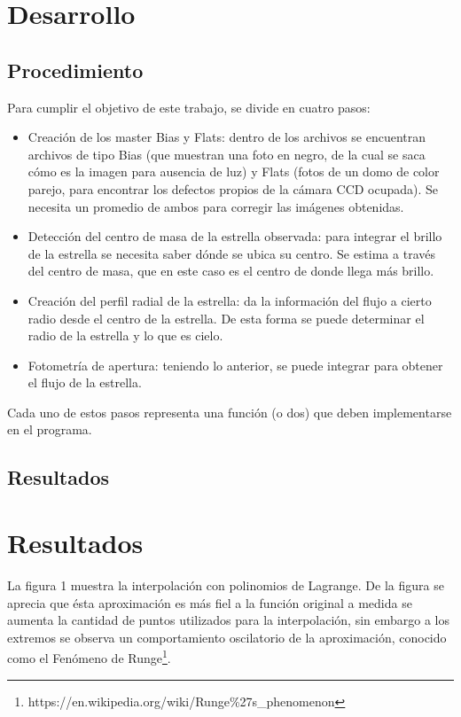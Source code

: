 \documentclass[a4paper, 11pt, spanish]{article}
\begin{document}
\section{Desarrollo}
\subsection{Procedimiento}

Para cumplir el objetivo de este trabajo, se divide en cuatro pasos:

\begin{itemize}
	\item Creaci\'on de los master Bias y Flats: dentro de los archivos se encuentran archivos de tipo Bias (que muestran una foto en negro, de la cual se saca c\'omo es la imagen para ausencia de luz) y Flats (fotos de un domo de color parejo, para encontrar los defectos propios de la c\'amara CCD ocupada). Se necesita un promedio de ambos para corregir las im\'agenes obtenidas.
	\item Detecci\'on del centro de masa de la estrella observada: para integrar el brillo de la estrella se necesita saber d\'onde se ubica su centro. Se estima a trav\'es del centro de masa, que en este caso es el centro de donde llega m\'as brillo.
	\item Creaci\'on del perfil radial de la estrella: da la informaci\'on del flujo a cierto radio desde el centro de la estrella. De esta forma se puede determinar el radio de la estrella y lo que es cielo.
	\item Fotometr\'ia de apertura: teniendo lo anterior, se puede integrar para obtener el flujo de la estrella. 
\end{itemize}

Cada uno de estos pasos representa una funci\'on (o dos) que deben implementarse en el programa. 

\subsection{Resultados}


\section{Resultados}
La figura 1 muestra la interpolaci\'on con polinomios de Lagrange. De la figura se aprecia que \'esta aproximaci\'on es m\'as fiel a la funci\'on original a medida se aumenta la cantidad de puntos utilizados para la interpolaci\'on, sin embargo a los extremos se observa un comportamiento oscilatorio de la aproximaci\'on, conocido como el Fen\'omeno de Runge\footnote{https://en.wikipedia.org/wiki/Runge\%27s\_phenomenon}.
\end{document}
